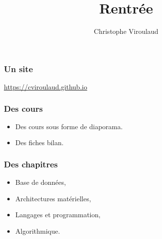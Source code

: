 \documentclass[svgnames,11pt]{beamer}
\author[]{Christophe Viroulaud}
\title{Rentrée}
\date{}
\institute{Terminale - NSI}
\begin{document}
\begin{frame}
\titlepage
\end{frame}
\begin{frame}
    \frametitle{Un site}

\begin{center}
    {\LARGE \url{https://cviroulaud.github.io}}
\end{center}
\end{frame}
\begin{frame}
    \frametitle{Des cours}

    
    \begin{itemize}
        \item Des cours sous forme de diaporama.
        \item Des fiches bilan.
    \end{itemize}

\end{frame}
\begin{frame}
    \frametitle{Des chapitres}

    \begin{itemize}
        \item Base de données,
        \item Architectures matérielles,
        \item Langages et programmation,
        \item Algorithmique.
    \end{itemize}

\end{frame}
\end{document}
